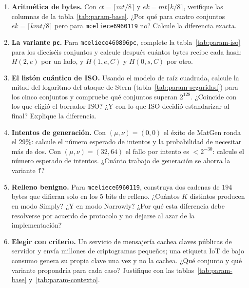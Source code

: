 \begin{enumerate}[leftmargin=1.6em,itemsep=4pt]
  \item \textbf{Aritmética de bytes.} Con $ct=\lceil mt/8\rceil$ y
        $ek=mt\lceil k/8\rceil$, verifique las columnas de la
        tabla~\ref{tab:param-base}. ¿Por qué para cuatro conjuntos
        $ek=\lceil kmt/8\rceil$ pero para \texttt{mceliece6960119} no?
        Calcule la diferencia exacta.
  \item \textbf{La variante \texttt{pc}.} Para
        \texttt{mceliece460896pc}, complete la
        tabla~\ref{tab:param-iso} para los dieciséis conjuntos y
        calcule después cuántos bytes recibe cada hash: $H(2,e)$ por
        un lado, y $H(1,e,C)$ y $H(0,s,C)$ por otro.
  \item \textbf{El listón cuántico de ISO.} Usando el modelo de raíz
        cuadrada, calcule la mitad del logaritmo del ataque de Stern
        (tabla~\ref{tab:param-seguridad}) para los cinco conjuntos y
        compruebe qué conjuntos superan $2^{128}$. ¿Coincide con los
        que eligió el borrador ISO? ¿Y con lo que ISO decidió
        estandarizar al final? Explique la diferencia.
  \item \textbf{Intentos de generación.} Con $(\mu,\nu)=(0,0)$ el
        éxito de MatGen ronda el $29\%$: calcule el número esperado de
        intentos y la probabilidad de necesitar más de dos. Con
        $(\mu,\nu)=(32,64)$ el fallo por intento es $<2^{-30}$:
        calcule el número esperado de intentos. ¿Cuánto trabajo de
        generación se ahorra la variante \texttt{f}?
  \item \textbf{Relleno benigno.} Para \texttt{mceliece6960119},
        construya dos cadenas de $194$ bytes que difieran solo en los
        $5$ bits de relleno. ¿Cuántos $K$ distintos producen en modo
        Simply? ¿Y en modo Narrowly? ¿Por qué esta diferencia debe
        resolverse por acuerdo de protocolo y no dejarse al azar de
        la implementación?
  \item \textbf{Elegir con criterio.} Un servicio de mensajería
        cachea claves públicas de servidor y envía millones de
        criptogramas pequeños; una etiqueta IoT de bajo consumo
        genera su propia clave una vez y no la cachea. ¿Qué conjunto
        y qué variante propondría para cada caso? Justifique con las
        tablas~\ref{tab:param-base} y~\ref{tab:param-contexto}.
\end{enumerate}
